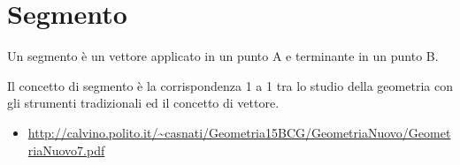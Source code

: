 \section{Segmento}
\begin{definizione}
Un segmento è un vettore applicato in un punto A e terminante in un punto B.
\end{definizione}

\begin{osservazione}
Il concetto di segmento è la corrispondenza 1 a 1 tra lo studio della geometria con gli strumenti tradizionali ed il concetto di vettore.
\end{osservazione}

\begin{osservazione}
\begin{itemize}
 \item \url{http://calvino.polito.it/~casnati/Geometria15BCG/GeometriaNuovo/GeometriaNuovo7.pdf}
\end{itemize}
\end{osservazione}


